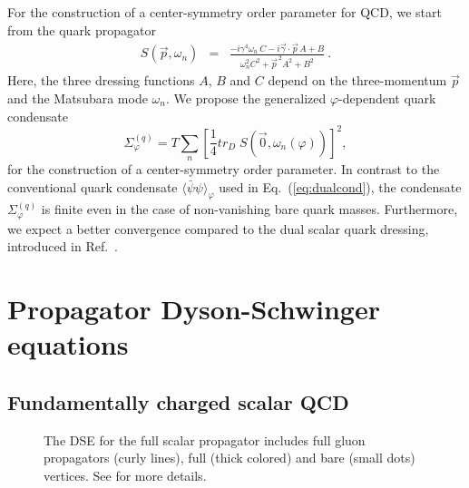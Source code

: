 \documentclass[final,twocolumn,merge,sort&compress]{elsarticle}
\def\Eq#1{Eq.~(\ref{#1})}
\begin{document}
For the construction of a center-symmetry order parameter for QCD, we
start from the quark propagator
\begin{eqnarray}
\label{eq:quark_propagator}
  S(\vec{p},\omega_n) & = & \frac{-i\gamma^4 \omega_n\,C -i \vec{\gamma}\cdot\vec{p}\,A + B} {\omega_n^2 C^2 + \vec{p}^{\,2} A^2 + B^2}\ .
\end{eqnarray}
Here, the three dressing functions $A$, $B$ and $C$ depend on the
three-momentum $\vec p$ and the Matsubara mode $\omega_n$.  We propose
the generalized $\varphi$-dependent quark condensate
\begin{equation}
 \label{eq:order_parameter_quark}
 \Sigma_\varphi^{(q)} = T \sum\limits_n \left[\dfrac{1}{4}tr_D\;S(\vec{0},\omega_n(\varphi)) \right]^2,
\end{equation}
for the construction of a center-symmetry order parameter.  In
contrast to the conventional quark condensate
$\langle\bar\psi\psi\rangle_\varphi$ used in \Eq{eq:dualcond}, the
condensate $\Sigma_\varphi^{(q)}$ is finite even in the case of
non-vanishing bare quark masses. Furthermore, we expect a better
convergence compared to the dual scalar quark dressing, introduced in
Ref.~\cite{Fischer:2009gk}.

\section{Propagator Dyson-Schwinger equations}
\label{sec:DSE}

\subsection{Fundamentally charged scalar QCD}
\label{sec:scalarQCD}
\begin{figure*}[ht!]
  \centering 
  \vspace*{-0.3cm}
  \caption{\label{fig:dse_scalprop} The DSE for the full scalar
    propagator includes full gluon propagators (curly lines), full
    (thick colored) and bare (small dots) vertices. See
    \cite{Fister:2010ah} for more details.  }
\end{figure*}
\end{document}
